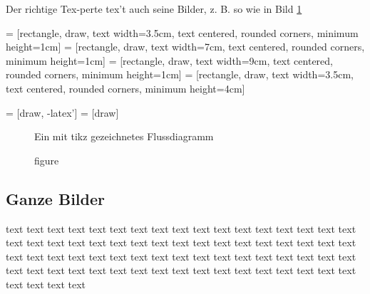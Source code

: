 Der richtige Tex-perte tex't auch seine Bilder, z. B. so wie in Bild \ref{bild2}

	 = [rectangle, draw, 
    text width=3.5cm, text centered, rounded corners, minimum height=1cm]
	 = [rectangle, draw, 
    text width=7cm, text centered, rounded corners, minimum height=1cm]
	 = [rectangle, draw, 
    text width=9cm, text centered, rounded corners, minimum height=1cm]
	 = [rectangle, draw, 
    text width=3.5cm, text centered, rounded corners, minimum height=4cm]
	 
	 = [draw, -latex']
	 = [draw]

\begin{figure}[H]
\begin{center}
\caption{figure}{Ein mit tikz gezeichnetes Flussdiagramm}
\label{bild2}
\end{center}
\end{figure}

\blindtext

\subsection{Ganze Bilder}
text text text text text text text text text text text text text text text text text text text text text text text text text text text text text text text text text text text text text text text text text text text text text text text text text text text text text text text text text text text text text text text text text text text text text text text text

